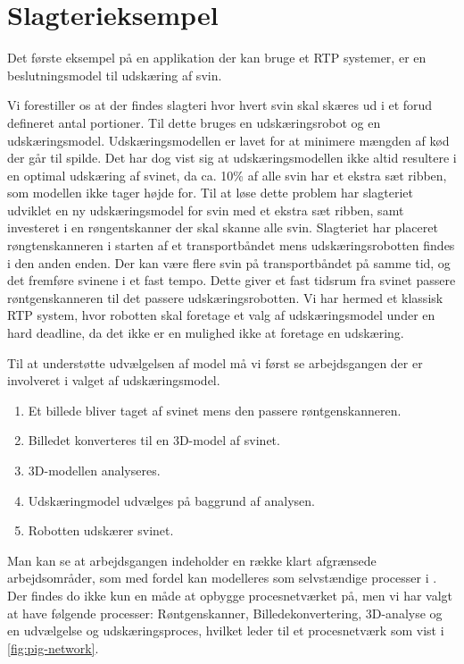 \section{Slagterieksempel}


Det første eksempel på en applikation der kan bruge et RTP systemer, er en beslutningsmodel til udskæring af svin.

Vi forestiller os at der findes slagteri hvor  hvert svin skal skæres ud i et forud defineret antal portioner. Til dette bruges en udskæringsrobot og en udskæringsmodel. Udskæringsmodellen er lavet for at minimere mængden af kød der går til spilde.  Det har dog vist sig at udskæringsmodellen ikke altid resultere i en  optimal udskæring af svinet, da  ca. 10\% af alle svin har et ekstra sæt ribben, som modellen ikke tager højde for. Til at løse dette problem har slagteriet udviklet en ny udskæringsmodel for svin med et ekstra sæt ribben, samt  investeret i en røngentskanner der skal skanne alle svin. 
Slagteriet har placeret røngtenskanneren i starten af et transportbåndet mens udskæringsrobotten findes i den anden enden. Der kan være flere svin på transportbåndet på samme tid, og det fremføre svinene i et fast tempo. Dette giver et fast tidsrum fra svinet passere røntgenskanneren til det passere udskæringsrobotten. Vi har hermed et klassisk RTP system, hvor robotten skal foretage et valg af udskæringsmodel under en hard deadline, da det ikke er en mulighed ikke at foretage en udskæring.

Til at understøtte udvælgelsen af model må vi først se arbejdsgangen der er involveret i valget af udskæringsmodel. 
\begin{enumerate}
\tightlist
	\item Et billede bliver taget af svinet mens den passere røntgenskanneren.
	\item Billedet konverteres til en 3D-model af svinet.
	\item 3D-modellen analyseres.
	\item Udskæringmodel udvælges på baggrund af analysen.
	\item Robotten udskærer svinet.
\end{enumerate}

Man kan se at arbejdsgangen indeholder en  række klart afgrænsede arbejdsområder, som med fordel kan modelleres som selvstændige processer i \pycsp. Der findes do ikke kun en måde at opbygge procesnetværket på, men vi har valgt at have følgende processer: Røntgenskanner, Billedekonvertering, 3D-analyse og en udvælgelse og udskæringsproces, hvilket leder til et procesnetværk som vist i \cref{fig:pig-network}.

